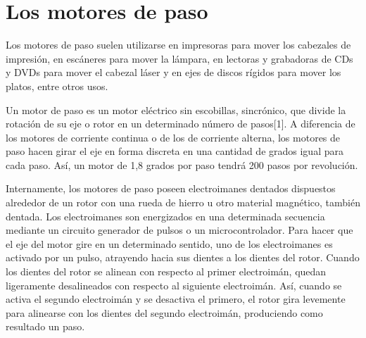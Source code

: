 \documentclass[final,narroweqnarray,inline,twoside]{ieee}
\newcommand{\itref}[1]{[{#1}]}
\begin{document}
\section{Los motores de paso}
Los motores de paso suelen utilizarse en impresoras para mover los cabezales de impresión, en escáneres para mover la
lámpara, en lectoras y grabadoras de CDs y DVDs para mover el cabezal láser y en ejes de discos rígidos para mover los
platos, entre otros usos.

Un motor de paso es un motor eléctrico sin escobillas, sincrónico, que divide la rotación de su eje o rotor en un determinado
número de pasos\itref{1}. A diferencia de los motores de corriente continua o de los de corriente alterna, los motores de
paso hacen girar el eje en forma discreta en una cantidad de grados igual para cada paso. Así, un motor de 1,8 grados por
paso tendrá 200 pasos por revolución.

Internamente, los motores de paso poseen electroimanes dentados dispuestos alrededor de un rotor con una rueda de hierro u
otro material magnético, también dentada. Los electroimanes son energizados en una determinada secuencia mediante un
circuito generador de pulsos o un microcontrolador. Para hacer que el eje del motor gire en un determinado sentido, uno de
los electroimanes es activado por un pulso, atrayendo hacia sus dientes a los dientes del rotor. Cuando los dientes del
rotor se alinean con respecto al primer electroimán, quedan ligeramente desalineados con respecto al siguiente electroimán.
Así, cuando se activa el segundo electroimán y se desactiva el primero, el rotor gira levemente para alinearse con los
dientes del segundo electroimán, produciendo como resultado un paso.
\end{document}
